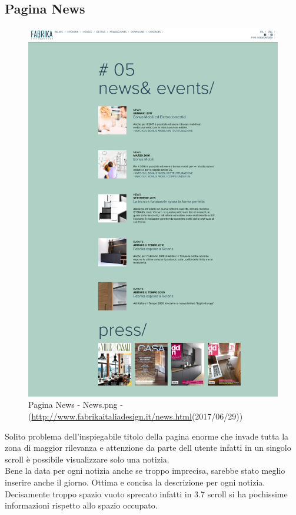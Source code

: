 \documentclass[../Relazione.tex]{subfiles}
\begin{document}
    \subsection{Pagina News}
        \begin{figure}[H]
            \centering
            \includegraphics[width=\textwidth]{img/News.png}
            \caption{Pagina News - News.png - (\url{http://www.fabrikaitaliadesign.it/news.html}(2017/06/29))}
        \end{figure}
        Solito problema dell'inspiegabile titolo della pagina enorme che invade tutta la zona di maggior rilevanza e attenzione da parte dell utente infatti in un singolo scroll è possibile visualizzare solo una notizia.\\
        Bene la data per ogni notizia anche se troppo imprecisa, sarebbe stato meglio inserire anche il giorno. Ottima e concisa la descrizione per ogni notizia.\\
        Decisamente troppo spazio vuoto sprecato infatti in 3.7 scroll si ha pochissime informazioni rispetto allo spazio occupato.
\end{document}
